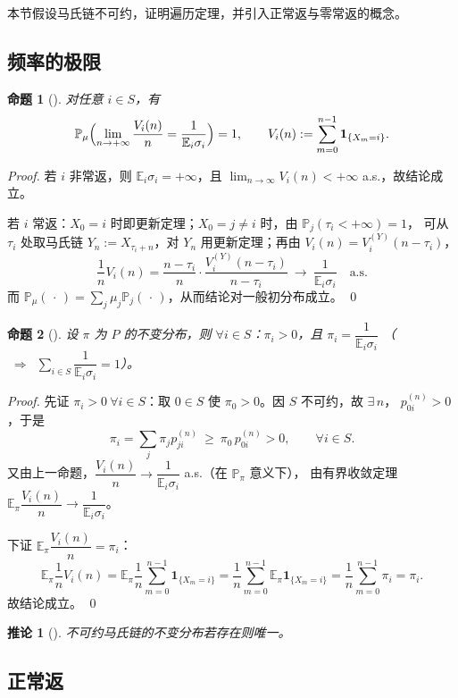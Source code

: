 \documentclass[lang=cn,10pt,newtx,thmcnt=chapter,mode=simple]{vividbook}
\providecommand{\E}{}\renewcommand{\E}{\mathbb{E}}
\providecommand{\Pp}{}\renewcommand{\Pp}{\mathbb{P}}
\newcommand{\ind}[1]{\mathbf{1}_{\{#1\}}}
\newcommand{\darr}{\;\Rightarrow\;}
\theoremstyle{vividthm}
\newtheorem*{vividproposition}{命题}
\newtheorem*{vividcorollary}{推论}
\theoremstyle{vividdef}
\theoremstyle{vividexa}
\theoremstyle{vividrem}
\renewenvironment{proposition}[1][]{\begin{vividproposition}[#1]}{\end{vividproposition}}
\renewenvironment{corollary}[1][]{\begin{vividcorollary}[#1]}{\end{vividcorollary}}
\begin{document}
本节假设马氏链不可约，证明遍历定理，并引入正常返与零常返的概念。

\subsection{频率的极限}

\begin{proposition}
对任意 $i\in S$，有
\[
\Pp_\mu\Bigl(\lim_{n\to+\infty}\frac{V_i(n)}{n}=\frac{1}{\E_i\sigma_i}\Bigr)=1,
\qquad
V_i(n):=\sum_{m=0}^{n-1}\ind{X_m=i}.
\]
\end{proposition}

\begin{proof}
若 $i$ 非常返，则 $\E_i\sigma_i=+\infty$，且 $\lim_{n\to\infty}V_i(n)<+\infty$ a.s.，故结论成立。

若 $i$ 常返：$X_0=i$ 时即更新定理；$X_0=j\ne i$ 时，由 $\Pp_j(\tau_i<+\infty)=1$，
可从 $\tau_i$ 处取马氏链 $Y_n:=X_{\tau_i+n}$，对 $Y_n$ 用更新定理；再由
$V_i(n)=V_i^{(Y)}(n-\tau_i)$，
\[
\frac1nV_i(n)=\frac{n-\tau_i}{n}\cdot\frac{V_i^{(Y)}(n-\tau_i)}{n-\tau_i}
\ \longrightarrow\ \frac{1}{\E_i\sigma_i}\quad\text{a.s.}
\]
而 $\Pp_\mu(\,\cdot\,)=\sum_j\mu_j\Pp_j(\,\cdot\,)$，从而结论对一般初分布成立。 \qed
\end{proof}

\begin{proposition}
设 $\pi$ 为 $P$ 的不变分布，则 $\forall i\in S$：$\pi_i>0$，且
$\pi_i=\dfrac{1}{\E_i\sigma_i}$
\quad（$\darr\ \sum_{i\in S}\dfrac{1}{\E_i\sigma_i}=1$）。
\end{proposition}

\begin{proof}
先证 $\pi_i>0\ \forall i\in S$：取 $0\in S$ 使 $\pi_0>0$。因 $S$ 不可约，故 $\exists\,n$，
$p_{0i}^{(n)}>0$，于是
\[
\pi_i=\sum_j\pi_jp_{ji}^{(n)}\ \ge\ \pi_0\,p_{0i}^{(n)}>0,\qquad\forall i\in S.
\]
又由上一命题，$\dfrac{V_i(n)}{n}\to\dfrac{1}{\E_i\sigma_i}$ a.s.（在 $\Pp_\pi$ 意义下），
由有界收敛定理 $\E_\pi\dfrac{V_i(n)}{n}\to\dfrac{1}{\E_i\sigma_i}$。

下证 $\E_\pi\dfrac{V_i(n)}{n}=\pi_i$：
\[
\E_\pi\frac1nV_i(n)=\E_\pi\frac1n\sum_{m=0}^{n-1}\ind{X_m=i}
=\frac1n\sum_{m=0}^{n-1}\E_\pi\ind{X_m=i}
=\frac1n\sum_{m=0}^{n-1}\pi_i=\pi_i .
\]
故结论成立。 \qed
\end{proof}

\begin{corollary}
不可约马氏链的不变分布若存在则唯一。
\end{corollary}

\subsection{正常返}
\end{document}
